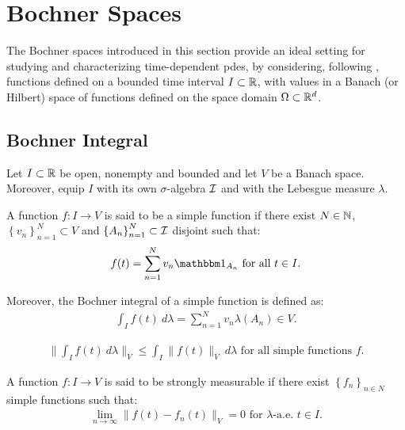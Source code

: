 \section{Bochner Spaces}

The Bochner spaces introduced in this section provide an ideal setting for studying and characterizing time-dependent \acrshort{pdes}, by considering, following \cite[p. 111]{Ern2021}, functions defined on a bounded time interval $I \subset \mathbb{R}$, with values in a Banach (or Hilbert) space of functions defined on the space domain $\Omega \subset \mathbb{R}^{d}$.

\subsection{Bochner Integral}

Let $I \subset \mathbb{R}$ be open, nonempty and bounded and let $V$ be a Banach space. Moreover, equip $I$ with its own $\sigma$-algebra $\mathcal{I}$ and with the Lebesgue measure $\lambda$.

\begin{definition}
    A function $f\colon I \rightarrow V$ is said to be a simple function if there exist $N \in \mathbb{N}$, $\left\{ v_n \right\}_{n = 1}^N \subset V$ and $\left\{ A_n \right\}_{n = 1}^N \subset \mathcal{I}$ disjoint such that:
    \begin{gather}
        f(t) = \sum_{n = 1}^N v_n \characteristic{A_n} \text{ for all } t \in I.
    \end{gather}

    Moreover, the Bochner integral of a simple function is defined as:
    \begin{gather}
        \int_I f(t) ~ d \lambda  = \sum_{n = 1}^N v_n \lambda(A_n) \in V.
    \end{gather}
\end{definition}

\begin{lemma}
    \begin{gather}
        \lVert \int_I f(t) ~ d \lambda \rVert_V \leq \int_I \lVert f(t) \rVert_V ~ d \lambda \text{ for all simple functions } f.
    \end{gather}
\end{lemma}

\begin{definition}
    A function $f\colon I \rightarrow V$ is said to be strongly measurable if there exist $\left\{ f_n \right\}_{n \in N}$ simple functions such that:
    \begin{gather}
        \lim_{n \rightarrow \infty} \lVert f(t) - f_n(t) \rVert_V = 0 \text{ for } \lambda \text{-a.e. } t \in I.
    \end{gather}
\end{definition}

